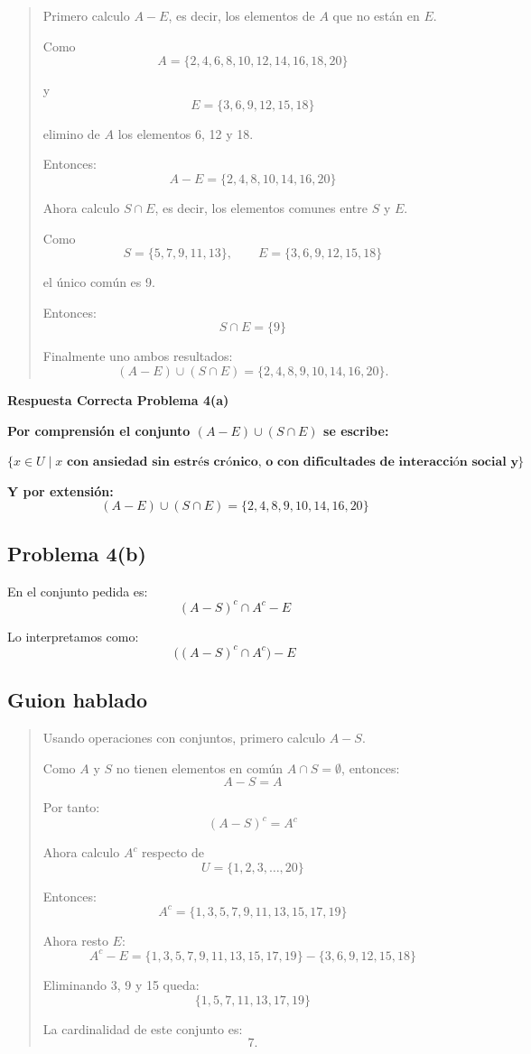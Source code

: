 \documentclass[12pt]{article}
\begin{document}
	\begin{quote}
		Primero calculo \(A-E\), es decir, los elementos de \(A\) que no están en \(E\).
		
		Como
		\[
		A=\{2,4,6,8,10,12,14,16,18,20\}
		\]
		
		y
		\[
		E=\{3,6,9,12,15,18\}
		\]
		
		elimino de \(A\) los elementos 6, 12 y 18.
		
		Entonces:
		\[
		A-E=\{2,4,8,10,14,16,20\}
		\]
		
		Ahora calculo \(S\cap E\), es decir, los elementos comunes entre \(S\) y \(E\).
		
		Como
		\[
		S=\{5,7,9,11,13\},\qquad E=\{3,6,9,12,15,18\}
		\]
		
		el único común es 9.
		
		Entonces:
		\[
		S\cap E=\{9\}
		\]
		
		Finalmente uno ambos resultados:
		\[
		(A-E)\cup(S\cap E)=\{2,4,8,9,10,14,16,20\}.
		\]
	\end{quote}
	
	\textbf{Respuesta Correcta Problema 4(a)}
	
	\textbf{Por comprensión el conjunto $(A-E)\cup(S\cap E)$ se escribe:}
		
	\(\{x\in U \mid x \textbf{ con ansiedad sin estrés crónico, o con dificultades de interacción social y además con estrés crónico}\}\)	
	\medskip 
	
	\textbf{Y por extensión:}
	\[
	(A-E)\cup(S\cap E)=\{2,4,8,9,10,14,16,20\}
	\]
	
	\subsection*{Problema 4(b)}
	
	En el conjunto pedida es:
	\[
	(A-S)^c\cap A^c - E
	\]
	
	Lo interpretamos como:
	\[
	\big((A-S)^c\cap A^c\big)-E
	\]
	
	\subsection*{Guion hablado}
	
	\begin{quote}
	 Usando operaciones con conjuntos, primero calculo \(A-S\).
		
		Como \(A\) y \(S\) no tienen elementos en común $A\cap S=\emptyset$, entonces:
		\[
		A-S=A
		\]
		
		Por tanto:
		\[
		(A-S)^c=A^c
		\]
		
		Ahora calculo \(A^c\) respecto de
		\[
		U=\{1,2,3,\dots,20\}
		\]
		
		Entonces:
		\[
		A^c=\{1,3,5,7,9,11,13,15,17,19\}
		\]
		
		Ahora resto \(E\):
		\[
		A^c-E=\{1,3,5,7,9,11,13,15,17,19\}-\{3,6,9,12,15,18\}
		\]
		
		Eliminando 3, 9 y 15 queda:
		\[
		\{1,5,7,11,13,17,19\}
		\]
		
		La cardinalidad de este conjunto es:
		\[
		7.
		\]
	\end{quote}
	
\end{document}
